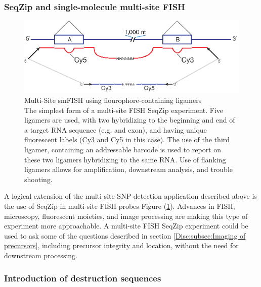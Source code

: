     \subsubsection{SeqZip and single-molecule multi-site FISH}
      \label{Disc:subsubsec:SeqZip and Single-Molecule FISH}

      \begin{figure} %
        \centering 
        \includegraphics{Figures/Discussion/MultiSiteFish.eps}
        \caption[Multi-Site smFISH using flourophore-containing ligamers]
        {
          Multi-Site smFISH using flourophore-containing ligamers
          \\ [0.25cm]
          The simplest form of a multi-site FISH SeqZip experiment. Five ligamers are used, with two hybridizing to the beginning and end of a target RNA sequence (e.g. and exon), and having unique fluorescent labels (Cy3 and Cy5 in this case). The use of the third ligamer, containing an addressable barcode is used to report on these two ligamers hybridizing to the same RNA. Use of flanking ligamers allows for amplification, downstream analysis, and trouble shooting.
          }
        \label{Disc:fig:MultiSite FISH using SeqZip}
        \end{figure}

      A logical extension of the multi-site SNP detection application described above is the use of SeqZip in multi-site FISH probes Figure (\ref{Disc:fig:MultiSite FISH using SeqZip}). Advances in FISH, microscopy, fluorescent moieties, and image processing are making this type of experiment more approachable. A multi-site FISH SeqZip experiment could be used to ask some of the questions described in section \ref{Disc:subsec:Imaging of precursors}, including precursor integrity and location, without the need for downstream processing.

    \subsubsection{Introduction of destruction sequences}
      \label{Disc:subsubsec:Intro of Desctruction Sequences}

